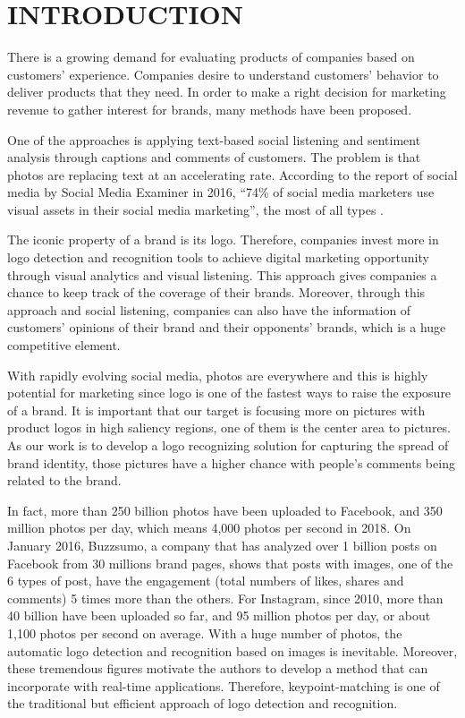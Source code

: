 \documentclass[letterpaper, 10 pt, conference]{ieeeconf}  %
\begin{document}
\section{INTRODUCTION}
There is a growing demand for evaluating products of companies based on customers' experience. Companies desire to understand customers' behavior to deliver products that they need. In order to make a right decision for marketing revenue to gather interest for brands, many methods have been proposed. \par
One of the approaches is applying text-based social listening and sentiment analysis through captions and comments of customers. The problem is that photos are replacing text at an accelerating rate. According to the report of social media by Social Media Examiner in 2016, \enquote{74\% of social media marketers use visual assets in their social media marketing}, the most of all types\cite{social-media-report} .\par
The iconic property of a brand is its logo. Therefore, companies invest more in logo detection and recognition tools to achieve digital marketing opportunity through visual analytics and visual listening\cite{5reasons}. This approach gives companies a chance to keep track of the coverage of their brands. Moreover, through this approach and social listening, companies can also have the information of customers' opinions of their brand and their opponents' brands, which is a huge competitive element.\par
With rapidly evolving social media, photos are everywhere and this is highly potential for marketing since logo is one of the fastest ways to raise the exposure of a brand. It is important that our target is focusing more on pictures with product logos in high saliency regions, one of them is the center area to pictures. As our work is to develop a logo recognizing solution for capturing the spread of brand identity, those pictures have a higher chance with people's comments being related to the brand. \par
In fact, more than 250 billion photos have been uploaded to Facebook\cite{facebook1}, and 350 million photos per day, which means 4,000 photos per second in 2018\cite{facebook1}. On January 2016, Buzzsumo, a company that has analyzed over 1 billion posts on Facebook from 30 millions brand pages, shows that posts with images, one of the 6 types of post, have the engagement  (total numbers of likes, shares and comments) 5 times more than the others\cite{facebook3}. For Instagram, since 2010, more than 40 billion have been uploaded so far, and 95 million photos per day, or about 1,100 photos per second on average\cite{instagram}. With a huge number of photos, the automatic logo detection and recognition based on images is inevitable. Moreover, these tremendous figures motivate the authors to develop a method that can incorporate with real-time applications. Therefore, keypoint-matching is one of the traditional but efficient approach of logo detection and recognition.\par
\end{document}
